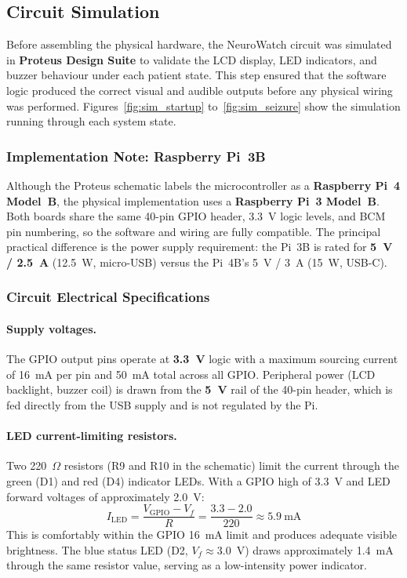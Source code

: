 \documentclass[12pt, a4paper]{report}
\begin{document}
\subsection{Circuit Simulation}
\label{sec:simulation}

Before assembling the physical hardware, the NeuroWatch circuit was simulated
in \textbf{Proteus Design Suite} to validate the LCD display, LED indicators,
and buzzer behaviour under each patient state. This step ensured that the
software logic produced the correct visual and audible outputs before any
physical wiring was performed. Figures~\ref{fig:sim_startup}
to~\ref{fig:sim_seizure} show the simulation running through each system
state.

\subsubsection*{Implementation Note: Raspberry Pi~3B}

Although the Proteus schematic labels the microcontroller as a
\textbf{Raspberry Pi~4 Model~B}, the physical implementation uses a
\textbf{Raspberry Pi~3 Model~B}. Both boards share the same 40-pin
GPIO header, 3.3~V logic levels, and BCM pin numbering, so the software
and wiring are fully compatible. The principal practical difference is the
power supply requirement: the Pi~3B is rated for \textbf{5~V / 2.5~A}
(12.5~W, micro-USB) versus the Pi~4B's 5~V / 3~A (15~W, USB-C).

\subsubsection*{Circuit Electrical Specifications}

\paragraph{Supply voltages.}
The GPIO output pins operate at \textbf{3.3~V} logic with a maximum
sourcing current of 16~mA per pin and 50~mA total across all GPIO.
Peripheral power (LCD backlight, buzzer coil) is drawn from the
\textbf{5~V} rail of the 40-pin header, which is fed directly from the
USB supply and is not regulated by the Pi.

\paragraph{LED current-limiting resistors.}
Two 220~$\Omega$ resistors (R9 and R10 in the schematic) limit the
current through the green (D1) and red (D4) indicator LEDs.  With a
GPIO high of 3.3~V and LED forward voltages of approximately 2.0~V:
\begin{equation}
  I_{\text{LED}} = \frac{V_{\text{GPIO}} - V_f}{R}
                 = \frac{3.3 - 2.0}{220} \approx 5.9~\text{mA}
  \label{eq:led_current}
\end{equation}
This is comfortably within the GPIO 16~mA limit and produces adequate
visible brightness. The blue status LED (D2, $V_f \approx 3.0$~V) draws
approximately 1.4~mA through the same resistor value, serving as a
low-intensity power indicator.
\end{document}
